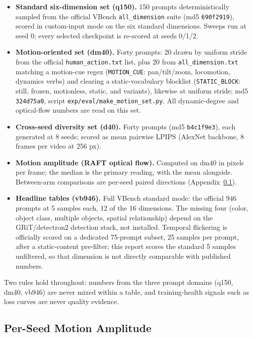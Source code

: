 \documentclass[11pt,a4paper]{article}
\begin{document}
\begin{itemize}
  \item \textbf{Standard six-dimension set (q150).} 150 prompts deterministically sampled from the official VBench \texttt{all\_dimension} suite (md5 \texttt{690f2919}), scored in custom-input mode on the six standard dimensions. Sweeps run at seed 0; every selected checkpoint is re-scored at seeds 0/1/2.
  \item \textbf{Motion-oriented set (dm40).} Forty prompts: 20 drawn by uniform stride from the official \texttt{human\_action.txt} list, plus 20 from \texttt{all\_dimension.txt} matching a motion-cue regex (\texttt{MOTION\_CUE}: pan/tilt/zoom, locomotion, dynamics verbs) and clearing a static-vocabulary blocklist (\texttt{STATIC\_BLOCK}: still, frozen, motionless, static, and variants), likewise at uniform stride; md5 \texttt{324d75a0}, script \texttt{exp/eval/make\_motion\_set.py}. All dynamic-degree and optical-flow numbers are read on this set.
  \item \textbf{Cross-seed diversity set (d40).} Forty prompts (md5 \texttt{b4c1f9e3}), each generated at 8 seeds; scored as mean pairwise LPIPS (AlexNet backbone, 8 frames per video at 256 px).
  \item \textbf{Motion amplitude (RAFT optical flow).} Computed on dm40 in pixels per frame; the median is the primary reading, with the mean alongside. Between-arm comparisons are per-seed paired directions (Appendix~\ref{sec:app-flow}).
  \item \textbf{Headline tables (vb946).} Full VBench standard mode: the official 946 prompts at 5 samples each, 12 of the 16 dimensions. The missing four (color, object class, multiple objects, spatial relationship) depend on the GRiT/detectron2 detection stack, not installed. Temporal flickering is officially scored on a dedicated 75-prompt subset, 25 samples per prompt, after a static-content pre-filter; this report scores the standard 5 samples unfiltered, so that dimension is not directly comparable with published numbers.
\end{itemize}

Two rules hold throughout: numbers from the three prompt domains (q150, dm40, vb946) are never mixed within a table, and training-health signals such as loss curves are never quality evidence.

\subsection{Per-Seed Motion Amplitude}\label{sec:app-flow}
\end{document}
